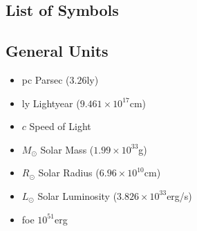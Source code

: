 \documentclass[12pt]{article}
\begin{document}
{} \label{listoffig}
\begin{center}
\listoffigures
\end{center}
\newpage

\cleardoublepage
{} \label{listoftab}
\begin{center}
\listoftables
\end{center}
\newpage

\begin{center}
\section*{\textbf{List of Symbols}}
\end{center}

\subsection*{General Units}
\begin{itemize}
    \item[]pc Parsec ($3.26$ly)
    \item[]ly Lightyear ($9.461\times 10^{17}$cm)
    \item[]$c$ Speed of Light
    \item[]$M_{\odot}$ Solar Mass ($1.99\times10^{33}$g)
    \item[]$R_{\odot}$ Solar Radius ($6.96\times10^{10}$cm)
    \item[]$L_{\odot}$ Solar Luminosity ($3.826\times10^{33}$erg/s)
    \item[]foe $10^{51}$erg
\end{itemize}

\newpage

\end{document}
